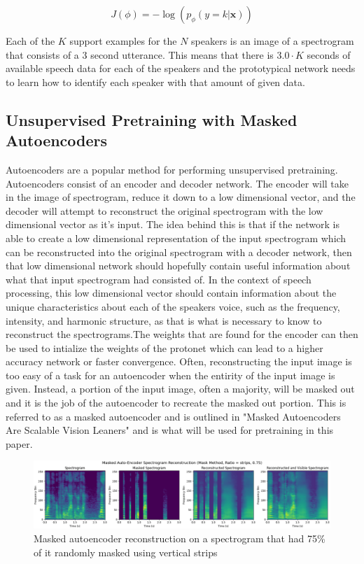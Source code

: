 \documentclass{article}
\begin{document}
\begin{equation}
  J\left(\phi\right) = - \log \left(p_\phi\left(y=k | \mathbf{x}\right)\right)
  \label{eq:prototypical_loss}
\end{equation}

Each of the $K$ support examples for the $N$ speakers is an image of a spectrogram that consists of a 3 second utterance.
This means that there is $3.0 \cdot K$ seconds of available speech data for each of the speakers and the prototypical
network needs to learn how to identify each speaker with that amount of given data.

\subsection{Unsupervised Pretraining with Masked Autoencoders}
Autoencoders are a popular method for performing unsupervised pretraining. Autoencoders consist of an encoder and decoder
network. The encoder will take in the image of spectrogram, reduce it down to a low dimensional vector, and the decoder
will attempt to reconstruct the original spectrogram with the low dimensional vector as it's input. The idea behind this
is that if the network is able to create a low dimensional representation of the input spectrogram which can be reconstructed
into the original spectrogram with a decoder network, then that low dimensional network should hopefully contain useful 
information about what that input spectrogram had consisted of. In the context of speech processing, this low dimensional 
vector should contain information about the unique characteristics about each of the speakers voice, such as the frequency, 
intensity, and harmonic structure, as that is what is necessary to know to reconstruct the spectrograms.The weights that 
are found for the encoder can then be used to intialize the weights of the protonet which can lead to a higher accuracy 
network or faster convergence. Often, reconstructing the input image is too easy of a task for an autoencoder when the 
entirity of the input image is given. Instead, a portion of the input image, often a majority, will be masked out and it 
is the job of the autoencoder to recreate the masked out portion. This is referred to as a masked autoencoder and is 
outlined in "Masked Autoencoders Are Scalable Vision Leaners" \cite{MAE} and is what will be used for pretraining in this paper.

\begin{figure}
  \centering
  \includegraphics[width=1.0\textwidth]{Images/mae_mask_strips_mask_ratio_75_lr_005_batch_64.png}
  \caption{Masked autoencoder reconstruction on a spectrogram that had 75\% of it randomly masked using vertical strips}
  \label{fig:MAEStrips}
\end{figure}
\end{document}
